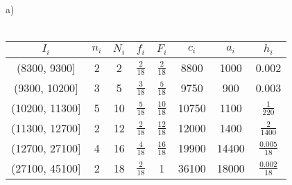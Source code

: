 \documentclass{article}
\begin{document}
\bigskip \noindent
a) \\ \\
\begin{tabular}{|c|c|c|c|c|c|c|c|}
    $I_i$          & $n_i$ & $N_i$ & $f_i$          & $F_i$           & $c_i$ & $a_i$ & $h_i$              \\
    \hline
    (8300, 9300]   & 2     & 2     & $\frac{2}{18}$ & $\frac{2}{18}$  & 8800  & 1000  & 0.002              \\
    \hline
    (9300, 10200]  & 3     & 5     & $\frac{3}{18}$ & $\frac{5}{18}$  & 9750  & 900   & 0.003              \\
    \hline
    (10200, 11300] & 5     & 10    & $\frac{5}{18}$ & $\frac{10}{18}$ & 10750 & 1100  & $\frac{1}{220}$    \\
    \hline
    (11300, 12700] & 2     & 12    & $\frac{2}{18}$ & $\frac{12}{18}$ & 12000 & 1400  & $\frac{2}{1400}$   \\
    \hline
    (12700, 27100] & 4     & 16    & $\frac{4}{18}$ & $\frac{16}{18}$ & 19900 & 14400 & $\frac{0.005}{18}$ \\
    \hline
    (27100, 45100] & 2     & 18    & $\frac{2}{18}$ & 1               & 36100 & 18000 & $\frac{0.002}{18}$ \\
    \hline
\end{tabular}
\end{document}
